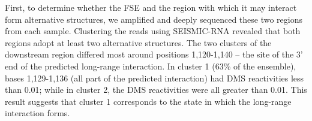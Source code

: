 \documentclass[main.tex]{subfiles}
\begin{document}
First, to determine whether the FSE and the region with which it may interact form alternative structures, we amplified and deeply sequenced these two regions from each sample.
Clustering the reads using SEISMIC-RNA revealed that both regions adopt at least two alternative structures.
The two clusters of the downstream region differed most around positions 1,120-1,140 -- the site of the 3' end of the predicted long-range interaction.
In cluster 1 (63\% of the ensemble), bases 1,129-1,136 (all part of the predicted interaction) had DMS reactivities less than 0.01; while in cluster 2, the DMS reactivities were all greater than 0.01.
This result suggests that cluster 1 corresponds to the state in which the long-range interaction forms.
\end{document}
